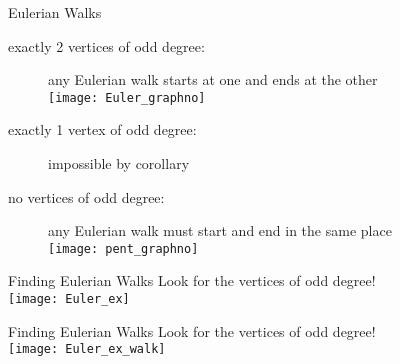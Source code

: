 \documentclass{beamer}
\begin{document}
\begin{frame}{Eulerian Walks}
\begin{description}
\item[exactly 2 vertices of odd degree:] any Eulerian walk starts at one and ends at the other\\
\texttt{[image: Euler\_graphno]}
\item[exactly 1 vertex of odd degree:] impossible by corollary
\item[no vertices of odd degree:] any Eulerian walk must start and end in the same place\\
\texttt{[image: pent\_graphno]}
\end{description}
\end{frame}
\begin{frame}{Finding Eulerian Walks}
Look for the vertices of odd degree!\vspace*{.2cm}\\
\texttt{[image: Euler\_ex]}
\end{frame}
\begin{frame}{Finding Eulerian Walks}
Look for the vertices of odd degree!\vspace*{.2cm}\\
\texttt{[image: Euler\_ex\_walk]}
\end{frame}
\end{document}
